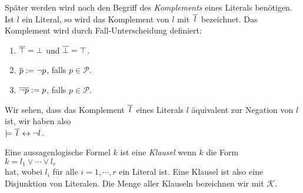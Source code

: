Sp\"{a}ter werden wird noch den Begriff des \emph{\color{blue}Komplements} eines Literals ben\"{o}tigen.
Ist $l$ ein Literal, so wird das Komplement von $l$ mit $\overline{\,l\,}$
bezeichnet.  Das Komplement wird durch Fall-Unterscheidung definiert:
\begin{enumerate}
\item $\overline{\top} = \bot$ \quad und \quad $\overline{\bot} = \top$. 
\item $\overline{p} := \neg p$, \quad falls $p \in \mathcal{P}$.
\item $\overline{\neg p} := p$, \quad falls $p \in \mathcal{P}$.
\end{enumerate}
Wir sehen, dass das Komplement $\overline{\,l\,}$ eines Literals $l$ \"{a}quivalent zur
Negation von $l$ ist, wir haben also
\\[0.2cm]
\hspace*{1.3cm}
$\models \overline{\,l\,} \leftrightarrow \neg l$.

\begin{Definition}[Klausel]
  Eine aussagenlogische Formel $k$ ist eine \emph{\color{blue}Klausel} wenn $k$ die Form \\[0.2cm]
  \hspace*{1.3cm} $k = l_1 \vee \cdots \vee l_r$ \\[0.2cm]
  hat, wobei $l_i$ f\"{u}r alle $i=1,\cdots,r$ ein Literal ist.  Eine Klausel ist also eine
  Disjunktion von Literalen. 
  Die Menge aller Klauseln bezeichnen wir mit $\mathcal{K}$.
  \eox
\end{Definition}

